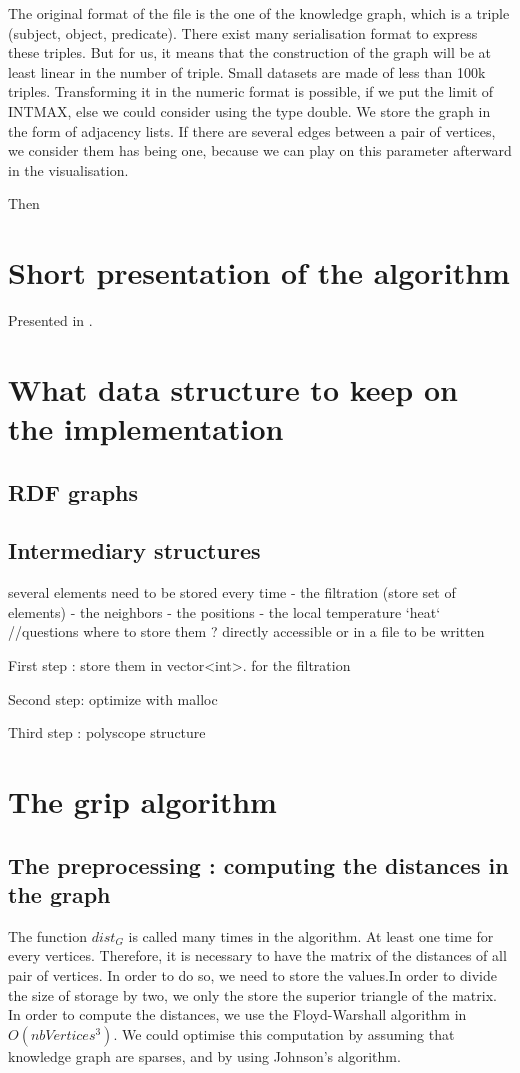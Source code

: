 \documentclass{article}
\begin{document}
The original format of the file is the one of the knowledge graph, which is a triple (subject, object, predicate). There exist many serialisation format to express these triples. But for us, it means that the construction of the graph will be at least linear in the number of triple. Small datasets are made of less than 100k triples. Transforming it in the numeric format is possible, if we put the limit of INT\textunderscore MAX, else we could consider using the type double. We store the graph in the form of adjacency lists. If there are several edges between a pair of vertices, we consider them has being one, because we can play on this parameter afterward in the visualisation. 



Then 

\section{Short presentation of the algorithm}
Presented in \cite{gajer00}. 

\section{What data structure to keep on the implementation}
\subsection{RDF  graphs}

\subsection{Intermediary structures}
several elements need to be stored every time 
- the filtration (store set of elements)
- the neighbors
- the positions 
- the local temperature `heat` 
//questions where to store them ? directly accessible or in a file to be written

First step : store them in vector<int>. 
    for the filtration

Second step: optimize with malloc

Third step : polyscope structure 



\section{The grip algorithm}

\subsection{The preprocessing : computing the distances in the graph}
The function $dist_{G}$ is called many times in the algorithm. At least one time for every vertices. Therefore, it is necessary to have the matrix of the distances of all pair of vertices. In order to do so, we need to store the values.In order to divide the size of storage by two, we only the store the superior triangle of the matrix. 
In order to compute the distances, we use the Floyd-Warshall algorithm in $O(nbVertices^3)$. We could optimise this computation by assuming that knowledge graph are sparses, and by using Johnson's algorithm.  
\end{document}
